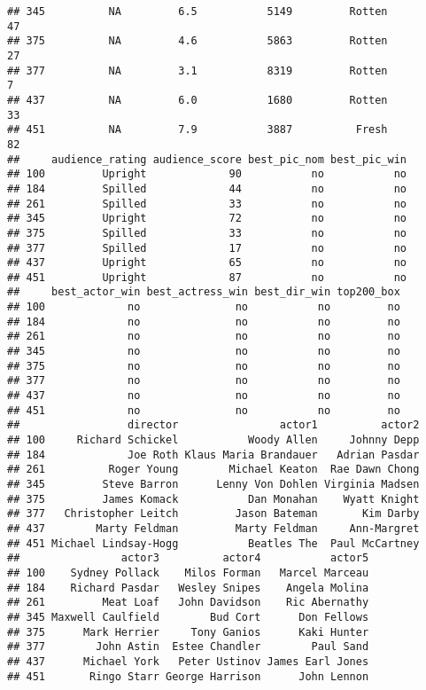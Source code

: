 \documentclass[]{article}
\begin{document}
\begin{verbatim}
## 345          NA         6.5           5149         Rotten            47
## 375          NA         4.6           5863         Rotten            27
## 377          NA         3.1           8319         Rotten             7
## 437          NA         6.0           1680         Rotten            33
## 451          NA         7.9           3887          Fresh            82
##     audience_rating audience_score best_pic_nom best_pic_win
## 100         Upright             90           no           no
## 184         Spilled             44           no           no
## 261         Spilled             33           no           no
## 345         Upright             72           no           no
## 375         Spilled             33           no           no
## 377         Spilled             17           no           no
## 437         Upright             65           no           no
## 451         Upright             87           no           no
##     best_actor_win best_actress_win best_dir_win top200_box
## 100             no               no           no         no
## 184             no               no           no         no
## 261             no               no           no         no
## 345             no               no           no         no
## 375             no               no           no         no
## 377             no               no           no         no
## 437             no               no           no         no
## 451             no               no           no         no
##                 director                actor1          actor2
## 100     Richard Schickel           Woody Allen     Johnny Depp
## 184             Joe Roth Klaus Maria Brandauer   Adrian Pasdar
## 261          Roger Young        Michael Keaton  Rae Dawn Chong
## 345         Steve Barron      Lenny Von Dohlen Virginia Madsen
## 375         James Komack           Dan Monahan    Wyatt Knight
## 377   Christopher Leitch         Jason Bateman       Kim Darby
## 437        Marty Feldman         Marty Feldman     Ann-Margret
## 451 Michael Lindsay-Hogg           Beatles The  Paul McCartney
##                actor3          actor4           actor5
## 100    Sydney Pollack    Milos Forman   Marcel Marceau
## 184    Richard Pasdar   Wesley Snipes    Angela Molina
## 261         Meat Loaf   John Davidson    Ric Abernathy
## 345 Maxwell Caulfield        Bud Cort      Don Fellows
## 375      Mark Herrier     Tony Ganios      Kaki Hunter
## 377        John Astin  Estee Chandler        Paul Sand
## 437      Michael York   Peter Ustinov James Earl Jones
## 451       Ringo Starr George Harrison      John Lennon

\end{verbatim}
\end{document}
